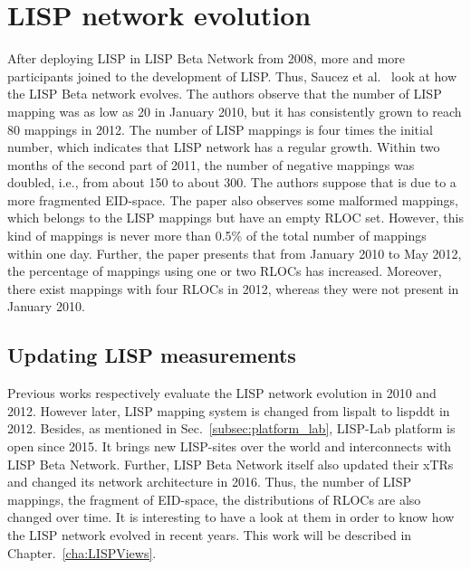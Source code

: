 \section{LISP network evolution}
\label{sec:evolution}
After deploying LISP in LISP Beta Network from 2008, more and more participants joined to the development of LISP. %
Thus, Saucez et al.~\cite{lispCCR} look at how the LISP Beta network evolves. The authors observe that the number of LISP mapping was as low as 20 in January 2010, but it has consistently grown to reach 80 mappings in 2012. The number of LISP mappings is four times the initial number, which indicates that LISP network has a regular growth. Within two months of the second part of 2011, the number of negative mappings was doubled, i.e., from about 150 to about 300. The authors suppose that is due to a more fragmented EID-space. The paper also observes some malformed mappings, which belongs to the LISP mappings but have an empty RLOC set. However, this kind of mappings is never more than 0.5\% of the total number of mappings within one day. Further, the paper presents that from January 2010 to May 2012, the percentage of mappings using one or two RLOCs has increased. Moreover, there exist mappings with four RLOCs in 2012, whereas they were not present in January 2010.

\subsection{Updating LISP measurements}
\label{subsec:evolution_missing}
Previous works respectively evaluate the LISP network evolution in 2010 and 2012. However later, LISP mapping system is changed from \acrshort{lispalt} to \acrshort{lispddt} in 2012. Besides, as mentioned in Sec.~\ref{subsec:platform_lab}, LISP-Lab platform is open since 2015. It brings new LISP-sites over the world and interconnects with LISP Beta Network. Further, LISP Beta Network itself also updated their xTRs and changed its network architecture in 2016. Thus, the number of LISP mappings, the fragment of EID-space, the distributions of RLOCs are also changed over time. It is interesting to have a look at them in order to know how the LISP network evolved in recent years. This work will be described in Chapter.~\ref{cha:LISPViews}.

